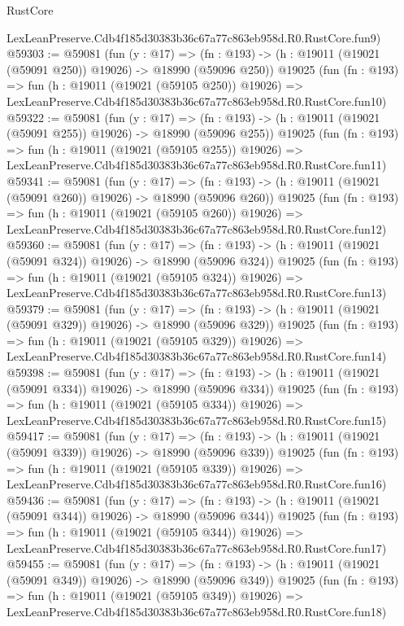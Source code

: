 \begin{lexlean}{RustCore}
\begin{coremodule}
    LexLeanPreserve.Cdb4f185d30383b36c67a77c863eb958d.R0.RustCore.fun9)
@59303 := @59081
    (fun (y : @17) =>
    (fn : @193) -> (h : @19011 (@19021 (@59091 @250)) @19026) -> @18990 (@59096 @250))
    @19025
    (fun (fn : @193) =>
    fun (h : @19011 (@19021 (@59105 @250)) @19026) =>
    LexLeanPreserve.Cdb4f185d30383b36c67a77c863eb958d.R0.RustCore.fun10)
@59322 := @59081
    (fun (y : @17) =>
    (fn : @193) -> (h : @19011 (@19021 (@59091 @255)) @19026) -> @18990 (@59096 @255))
    @19025
    (fun (fn : @193) =>
    fun (h : @19011 (@19021 (@59105 @255)) @19026) =>
    LexLeanPreserve.Cdb4f185d30383b36c67a77c863eb958d.R0.RustCore.fun11)
@59341 := @59081
    (fun (y : @17) =>
    (fn : @193) -> (h : @19011 (@19021 (@59091 @260)) @19026) -> @18990 (@59096 @260))
    @19025
    (fun (fn : @193) =>
    fun (h : @19011 (@19021 (@59105 @260)) @19026) =>
    LexLeanPreserve.Cdb4f185d30383b36c67a77c863eb958d.R0.RustCore.fun12)
@59360 := @59081
    (fun (y : @17) =>
    (fn : @193) -> (h : @19011 (@19021 (@59091 @324)) @19026) -> @18990 (@59096 @324))
    @19025
    (fun (fn : @193) =>
    fun (h : @19011 (@19021 (@59105 @324)) @19026) =>
    LexLeanPreserve.Cdb4f185d30383b36c67a77c863eb958d.R0.RustCore.fun13)
@59379 := @59081
    (fun (y : @17) =>
    (fn : @193) -> (h : @19011 (@19021 (@59091 @329)) @19026) -> @18990 (@59096 @329))
    @19025
    (fun (fn : @193) =>
    fun (h : @19011 (@19021 (@59105 @329)) @19026) =>
    LexLeanPreserve.Cdb4f185d30383b36c67a77c863eb958d.R0.RustCore.fun14)
@59398 := @59081
    (fun (y : @17) =>
    (fn : @193) -> (h : @19011 (@19021 (@59091 @334)) @19026) -> @18990 (@59096 @334))
    @19025
    (fun (fn : @193) =>
    fun (h : @19011 (@19021 (@59105 @334)) @19026) =>
    LexLeanPreserve.Cdb4f185d30383b36c67a77c863eb958d.R0.RustCore.fun15)
@59417 := @59081
    (fun (y : @17) =>
    (fn : @193) -> (h : @19011 (@19021 (@59091 @339)) @19026) -> @18990 (@59096 @339))
    @19025
    (fun (fn : @193) =>
    fun (h : @19011 (@19021 (@59105 @339)) @19026) =>
    LexLeanPreserve.Cdb4f185d30383b36c67a77c863eb958d.R0.RustCore.fun16)
@59436 := @59081
    (fun (y : @17) =>
    (fn : @193) -> (h : @19011 (@19021 (@59091 @344)) @19026) -> @18990 (@59096 @344))
    @19025
    (fun (fn : @193) =>
    fun (h : @19011 (@19021 (@59105 @344)) @19026) =>
    LexLeanPreserve.Cdb4f185d30383b36c67a77c863eb958d.R0.RustCore.fun17)
@59455 := @59081
    (fun (y : @17) =>
    (fn : @193) -> (h : @19011 (@19021 (@59091 @349)) @19026) -> @18990 (@59096 @349))
    @19025
    (fun (fn : @193) =>
    fun (h : @19011 (@19021 (@59105 @349)) @19026) =>
    LexLeanPreserve.Cdb4f185d30383b36c67a77c863eb958d.R0.RustCore.fun18)

\end{coremodule}
\end{lexlean}
